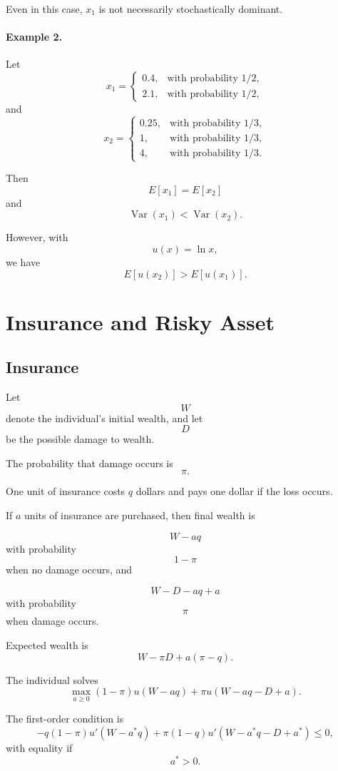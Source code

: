 Even in this case, \(x_1\) is not necessarily stochastically dominant.

\paragraph{Example 2.}

Let
\[
x_1=
\begin{cases}
0.4, & \text{with probability } 1/2,\\
2.1, & \text{with probability } 1/2,
\end{cases}
\]
and
\[
x_2=
\begin{cases}
0.25, & \text{with probability } 1/3,\\
1, & \text{with probability } 1/3,\\
4, & \text{with probability } 1/3.
\end{cases}
\]

Then
\[
E[x_1]=E[x_2]
\]
and
\[
\operatorname{Var}(x_1)<\operatorname{Var}(x_2).
\]

However, with
\[
u(x)=\ln x,
\]
we have
\[
E[u(x_2)]>E[u(x_1)].
\]

\section{Insurance and Risky Asset}

\subsection{Insurance}

Let
\[
W
\]
denote the individual's initial wealth, and let
\[
D
\]
be the possible damage to wealth.

The probability that damage occurs is
\[
\pi.
\]

One unit of insurance costs \(q\) dollars and pays one dollar if the loss occurs.

If \(a\) units of insurance are purchased, then final wealth is

\[
W-aq
\]
with probability
\[
1-\pi
\]
when no damage occurs, and

\[
W-D-aq+a
\]
with probability
\[
\pi
\]
when damage occurs.

Expected wealth is
\[
W-\pi D+a(\pi-q).
\]

The individual solves
\[
\max_{a\ge 0}
(1-\pi)u(W-aq)
+
\pi u(W-aq-D+a).
\]

The first-order condition is
\[
-q(1-\pi)u'(W-a^*q)
+
\pi(1-q)u'(W-a^*q-D+a^*)
\le 0,
\]
with equality if
\[
a^*>0.
\]

